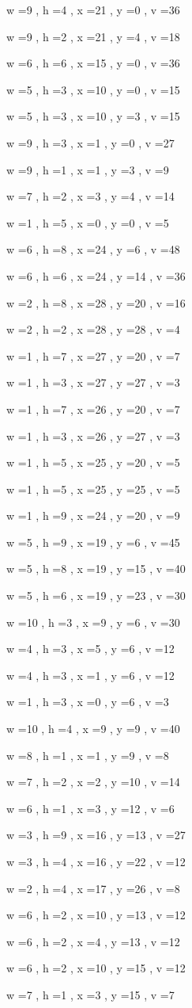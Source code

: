\documentclass[11pt]{article}
\begin{document}
w =9 , h =4 , x =21 , y =0 , v =36
\par
w =9 , h =2 , x =21 , y =4 , v =18
\par
w =6 , h =6 , x =15 , y =0 , v =36
\par
w =5 , h =3 , x =10 , y =0 , v =15
\par
w =5 , h =3 , x =10 , y =3 , v =15
\par
w =9 , h =3 , x =1 , y =0 , v =27
\par
w =9 , h =1 , x =1 , y =3 , v =9
\par
w =7 , h =2 , x =3 , y =4 , v =14
\par
w =1 , h =5 , x =0 , y =0 , v =5
\par
w =6 , h =8 , x =24 , y =6 , v =48
\par
w =6 , h =6 , x =24 , y =14 , v =36
\par
w =2 , h =8 , x =28 , y =20 , v =16
\par
w =2 , h =2 , x =28 , y =28 , v =4
\par
w =1 , h =7 , x =27 , y =20 , v =7
\par
w =1 , h =3 , x =27 , y =27 , v =3
\par
w =1 , h =7 , x =26 , y =20 , v =7
\par
w =1 , h =3 , x =26 , y =27 , v =3
\par
w =1 , h =5 , x =25 , y =20 , v =5
\par
w =1 , h =5 , x =25 , y =25 , v =5
\par
w =1 , h =9 , x =24 , y =20 , v =9
\par
w =5 , h =9 , x =19 , y =6 , v =45
\par
w =5 , h =8 , x =19 , y =15 , v =40
\par
w =5 , h =6 , x =19 , y =23 , v =30
\par
w =10 , h =3 , x =9 , y =6 , v =30
\par
w =4 , h =3 , x =5 , y =6 , v =12
\par
w =4 , h =3 , x =1 , y =6 , v =12
\par
w =1 , h =3 , x =0 , y =6 , v =3
\par
w =10 , h =4 , x =9 , y =9 , v =40
\par
w =8 , h =1 , x =1 , y =9 , v =8
\par
w =7 , h =2 , x =2 , y =10 , v =14
\par
w =6 , h =1 , x =3 , y =12 , v =6
\par
w =3 , h =9 , x =16 , y =13 , v =27
\par
w =3 , h =4 , x =16 , y =22 , v =12
\par
w =2 , h =4 , x =17 , y =26 , v =8
\par
w =6 , h =2 , x =10 , y =13 , v =12
\par
w =6 , h =2 , x =4 , y =13 , v =12
\par
w =6 , h =2 , x =10 , y =15 , v =12
\par
w =7 , h =1 , x =3 , y =15 , v =7
\par
\newpage
\end{document}
